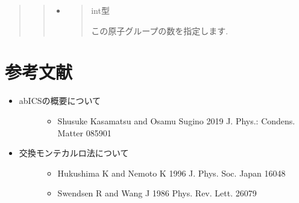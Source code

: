 \documentclass[letterpaper,10pt,dvipdfmx]{sphinxmanual}
\begin{document}
\begin{itemize}
\begin{quote}
\begin{itemize}
\begin{quote}
\begin{itemize}
\item {} 
\begin{quote}

 int型

この原子グループの数を指定します.
\end{quote}

\end{itemize}
\end{quote}

\end{itemize}
\end{quote}

\end{itemize}


\chapter{参考文献}
\label{\detokenize{algorithm/index::doc}}\label{\detokenize{algorithm/index:id1}}\begin{itemize}
\item {} \begin{description}
\item[{abICSの概要について}] \leavevmode\begin{itemize}
\item {} 
Shusuke Kasamatsu and Osamu Sugino 2019 J. Phys.: Condens. Matter  085901

\end{itemize}

\end{description}

\item {} \begin{description}
\item[{交換モンテカルロ法について}] \leavevmode\begin{itemize}
\item {} 
Hukushima K and Nemoto K 1996 J. Phys. Soc. Japan  1604\textendash{}8

\item {} 
Swendsen R and Wang J 1986 Phys. Rev. Lett.  2607\textendash{}9

\end{itemize}

\end{description}

\end{itemize}
\end{document}
